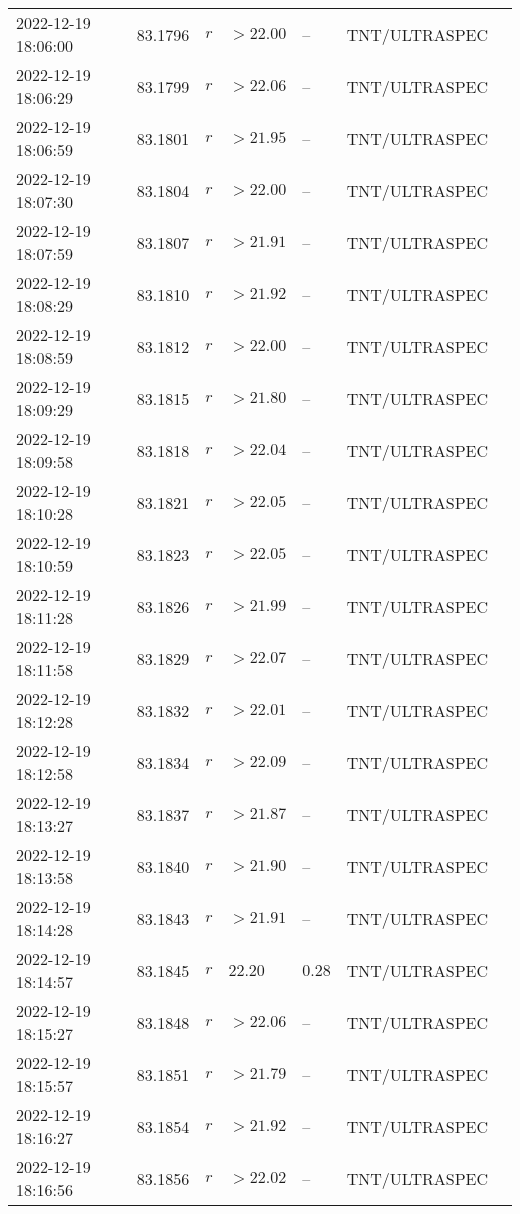 \documentclass{nature_plusfigure}
\begin{document}
\begin{supplement}
\begin{center}
\begin{longtable}{lllllll}
2022-12-19 18:06:00 & 83.1796 & $r$ & $>22.00$ & -- & TNT/ULTRASPEC &  \\ 
2022-12-19 18:06:29 & 83.1799 & $r$ & $>22.06$ & -- & TNT/ULTRASPEC &  \\ 
2022-12-19 18:06:59 & 83.1801 & $r$ & $>21.95$ & -- & TNT/ULTRASPEC &  \\ 
2022-12-19 18:07:30 & 83.1804 & $r$ & $>22.00$ & -- & TNT/ULTRASPEC &  \\ 
2022-12-19 18:07:59 & 83.1807 & $r$ & $>21.91$ & -- & TNT/ULTRASPEC &  \\ 
2022-12-19 18:08:29 & 83.1810 & $r$ & $>21.92$ & -- & TNT/ULTRASPEC &  \\ 
2022-12-19 18:08:59 & 83.1812 & $r$ & $>22.00$ & -- & TNT/ULTRASPEC &  \\ 
2022-12-19 18:09:29 & 83.1815 & $r$ & $>21.80$ & -- & TNT/ULTRASPEC &  \\ 
2022-12-19 18:09:58 & 83.1818 & $r$ & $>22.04$ & -- & TNT/ULTRASPEC &  \\ 
2022-12-19 18:10:28 & 83.1821 & $r$ & $>22.05$ & -- & TNT/ULTRASPEC &  \\ 
2022-12-19 18:10:59 & 83.1823 & $r$ & $>22.05$ & -- & TNT/ULTRASPEC &  \\ 
2022-12-19 18:11:28 & 83.1826 & $r$ & $>21.99$ & -- & TNT/ULTRASPEC &  \\ 
2022-12-19 18:11:58 & 83.1829 & $r$ & $>22.07$ & -- & TNT/ULTRASPEC &  \\ 
2022-12-19 18:12:28 & 83.1832 & $r$ & $>22.01$ & -- & TNT/ULTRASPEC &  \\ 
2022-12-19 18:12:58 & 83.1834 & $r$ & $>22.09$ & -- & TNT/ULTRASPEC &  \\ 
2022-12-19 18:13:27 & 83.1837 & $r$ & $>21.87$ & -- & TNT/ULTRASPEC &  \\ 
2022-12-19 18:13:58 & 83.1840 & $r$ & $>21.90$ & -- & TNT/ULTRASPEC &  \\ 
2022-12-19 18:14:28 & 83.1843 & $r$ & $>21.91$ & -- & TNT/ULTRASPEC &  \\ 
2022-12-19 18:14:57 & 83.1845 & $r$ & $22.20$ & $0.28$ & TNT/ULTRASPEC &  \\ 
2022-12-19 18:15:27 & 83.1848 & $r$ & $>22.06$ & -- & TNT/ULTRASPEC &  \\ 
2022-12-19 18:15:57 & 83.1851 & $r$ & $>21.79$ & -- & TNT/ULTRASPEC &  \\ 
2022-12-19 18:16:27 & 83.1854 & $r$ & $>21.92$ & -- & TNT/ULTRASPEC &  \\ 
2022-12-19 18:16:56 & 83.1856 & $r$ & $>22.02$ & -- & TNT/ULTRASPEC &  \\ 

\end{longtable}
\end{center}
\end{supplement}
\end{document}
